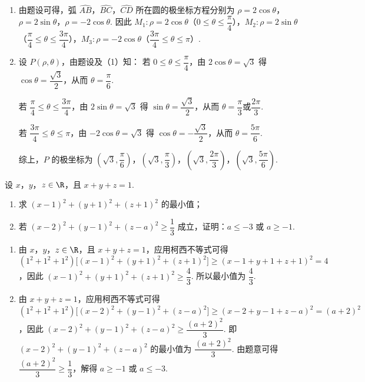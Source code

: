 \begin{solution}
\begin{enumerate}
\item 由题设可得，弧 \(\widehat{AB}\)，\(\widehat{BC}\)，\(\widehat{CD}\) 所在圆的极坐标方程分别为 \(\rho=2\cos\theta\)，\(\rho=2\sin\theta\)，\(\rho=-2\cos\theta\). 因此 \(M_1:\rho=2\cos\theta\)（\(0\le\theta\le\dfrac{\pi}{4}\)），\(M_2:\rho=2\sin\theta\)（\(\dfrac{\pi}{4}\le\theta\le\dfrac{3\pi}{4}\)），\(M_3:\rho=-2\cos\theta\)（\(\dfrac{3\pi}{4}\le\theta\le\pi\)）.

\item 设 \(P(\rho,\theta)\)，由题设及（1）知：
若 \(0\le\theta\le\dfrac{\pi}{4}\)，由 \(2\cos\theta=\sqrt3\) 得 \(\cos\theta=\dfrac{\sqrt3}{2}\)，从而 \(\theta=\dfrac{\pi}{6}\).

若 \(\dfrac{\pi}{4}\le\theta\le\dfrac{3\pi}{4}\)，由 \(2\sin\theta=\sqrt3\) 得 \(\sin\theta=\dfrac{\sqrt3}{2}\)，从而 \(\theta=\dfrac{\pi}{3}\)或\(\dfrac{2\pi}{3}\).

若 \(\dfrac{3\pi}{4}\le\theta\le\pi\)，由 \(-2\cos\theta=\sqrt3\) 得 \(\cos\theta=-\dfrac{\sqrt3}{2}\)，从而 \(\theta=\dfrac{5\pi}{6}\).

综上，\(P\) 的极坐标为 \(\left(\sqrt3,\dfrac{\pi}{6}\right)\)，\(\left(\sqrt3,\dfrac{\pi}{3}\right)\)，\(\left(\sqrt3,\dfrac{2\pi}{3}\right)\)，\(\left(\sqrt3,\dfrac{5\pi}{6}\right)\).
\end{enumerate}
\end{solution}

\begin{problem}
设 \(x\)，\(y\)，\(z\in\R\)，且 \(x+y+z=1\).

\begin{enumerate}
\item 求 \((x-1)^2+(y+1)^2+(z+1)^2\) 的最小值；
\item 若 \((x-2)^2+(y-1)^2+(z-a)^2\ge\dfrac13\) 成立，证明：\(a\le-3\) 或 \(a\ge-1\).
\end{enumerate}
\end{problem}

\begin{solution}
\begin{enumerate}
\item 由 \(x\)，\(y\)，\(z\in\R\)，且 \(x+y+z=1\)，应用柯西不等式可得 \((1^2+1^2+1^2)\bigl[(x-1)^2+(y+1)^2+(z+1)^2\bigr]\ge(x-1+y+1+z+1)^2=4\)，因此 \((x-1)^2+(y+1)^2+(z+1)^2\ge\dfrac43\). 所以最小值为 \(\dfrac43\).

\item 由 \(x+y+z=1\)，应用柯西不等式可得 \((1^2+1^2+1^2)\bigl[(x-2)^2+(y-1)^2+(z-a)^2\bigr]\ge(x-2+y-1+z-a)^2=(a+2)^2\)，因此 \((x-2)^2+(y-1)^2+(z-a)^2\ge\dfrac{(a+2)^2}{3}\).
即 \((x-2)^2+(y-1)^2+(z-a)^2\) 的最小值为 \(\dfrac{(a+2)^2}{3}\).
由题意可得 \(\dfrac{(a+2)^2}{3}\ge\dfrac13\)，解得 \(a\ge-1\) 或 \(a\le-3\).
\end{enumerate}
\end{solution}
